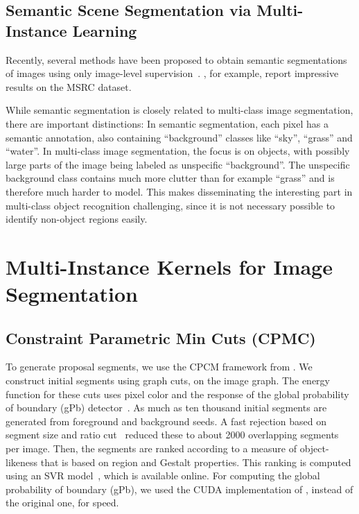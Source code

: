 

\subsection{Semantic Scene Segmentation via Multi-Instance Learning}
Recently, several methods have been proposed to obtain semantic segmentations of images using only
image-level supervision~\citep{vezhnevets2011weakly,verbeek2007region,vezhnevets2010towards}. \citet{vezhnevets2011weakly},
for example, report impressive results on the MSRC dataset.

While semantic segmentation is closely related to multi-class image segmentation, there are important
distinctions: In semantic segmentation, each pixel has a semantic annotation, also containing ``background''
classes like ``sky'', ``grass'' and ``water''. In multi-class image segmentation, the focus is on
objects, with possibly large parts of the image being labeled as unspecific ``background''.
The unspecific background class contains much more clutter than for example ``grass'' and is therefore
much harder to model.
This makes disseminating the interesting part in multi-class object recognition challenging, since it
is not necessary possible to identify non-object regions easily.


\section{Multi-Instance Kernels for Image Segmentation}
\subsection{Constraint Parametric Min Cuts (CPMC)}
To generate proposal segments, we use the CPCM framework from \citet{carreira2010constrained}. We construct initial
segments using graph cuts, on the image graph. The energy function for these cuts uses pixel
color and the response of the global probability of boundary (gPb) detector~\citep{maire2008using}. As much as ten thousand initial segments are generated from foreground
and background seeds. A fast rejection based on segment size and ratio cut~\citep{wang2003image} reduced these to about 2000 overlapping
segments per image. Then, the segments are ranked according to a measure of object-likeness that is based on region and Gestalt properties.
This ranking is computed using an SVR model~\citep{carreira2010constrained}, which is available online.
For computing the global probability of boundary (gPb), we used the CUDA implementation
of \citet{catanzaro2009efficient}, instead of the original one, for speed.

